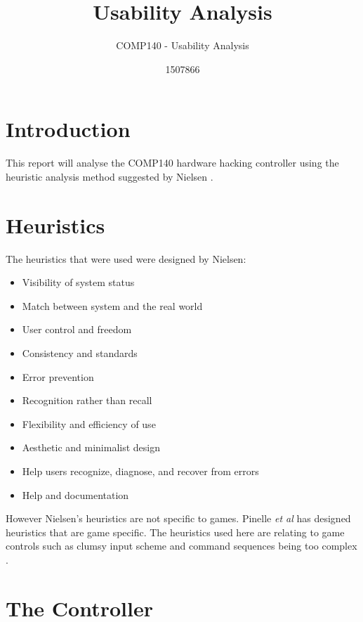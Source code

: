 \documentclass{scrartcl}
\title{Usability Analysis}
\subtitle{COMP140 - Usability Analysis}
\author{1507866}
\begin{document}
	
\maketitle


\section{Introduction}
This report will analyse the COMP140 hardware hacking controller using the heuristic analysis method suggested by Nielsen \cite{HeuristicEvaluation}.


\section{Heuristics}
The heuristics that were used were designed by Nielsen:

\begin{itemize}
	\item Visibility of system status
	\item Match between system and the real world
	\item User control and freedom	
	\item Consistency and standards
	\item Error prevention
	\item Recognition rather than recall
	\item Flexibility and efficiency of use
	\item Aesthetic and minimalist design
	\item Help users recognize, diagnose, and recover from errors	
	\item Help and documentation \cite{NNG}
\end{itemize}

However Nielsen's heuristics are not specific to games. Pinelle \textit{et al} has designed heuristics that are game specific. The heuristics used here are relating to game controls such as clumsy input scheme and command sequences being too complex \cite{Pinelle}.

\section{The Controller}
\end{document}
